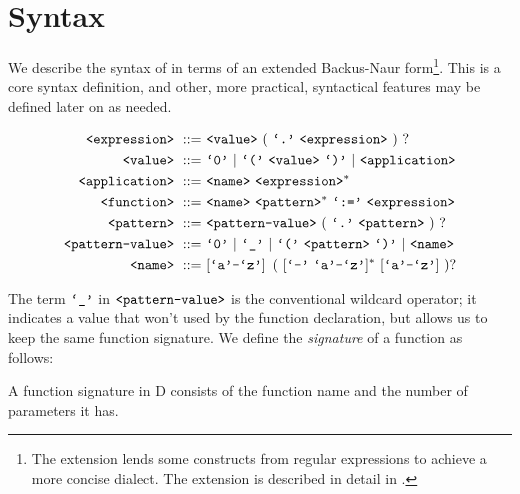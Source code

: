 \section{Syntax}\label{section:d-syntax}

We describe the syntax of  in terms of an extended Backus-Naur
form\footnote{The extension lends some constructs from regular expressions to
achieve a more concise dialect. The extension is described in detail in
.}. This is a core syntax definition, and other, more
practical, syntactical features may be defined later on as needed.

\begin{align}
\nonterm{expression}\ ::=&\ \nonterm{value}\ (\ \term{.}\ \nonterm{expression}
\ )\ ?\\
\nonterm{value}\ ::=&\ \term{0}\ |\ \term{(}\ \nonterm{value}\ \term{)}\ |
\ \nonterm{application}\\
\nonterm{application}\ ::=&\ \nonterm{name}
\ \nonterm{expression}^*\\
\nonterm{function}\ ::=&\ \nonterm{name}\ \nonterm{pattern}^*
\ \term{:=}\ \nonterm{expression}\\
\nonterm{pattern}\ ::=&\ \nonterm{pattern-value}\ (\ \term{.}
\ \nonterm{pattern}\ )\ ?\\
\nonterm{pattern-value}\ ::=&\ \term{0}\ |\ \term{\_}\ |\ \term{(}
\ \nonterm{pattern}\ \term{)}\ |\ \nonterm{name}\\
\nonterm{name}\ ::=&\ [\term{a}\mathmono{-}\term{z}]
\ \left (\ [\term{-}\ \term{a}\mathmono{-}\term{z}]^*
\ [\term{a}\mathmono{-}\term{z}]\ \right )?
\end{align}

The term $\text{{\ttfamily`\_'}}$ in $\text{{\ttfamily<pattern-value>}}$ is the conventional wildcard
operator; it indicates a value that won't used by the function declaration, but
allows us to keep the same function signature. We define the \emph{signature}
of a function as follows:

\begin{definition}

A function signature in D consists of the function name and the number of
parameters it has.

\end{definition}



